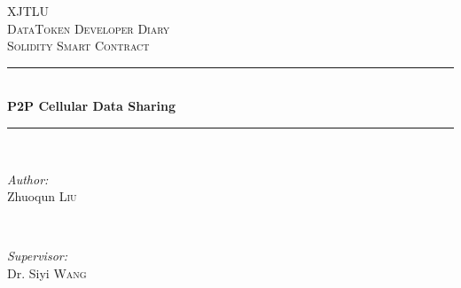\begin{titlepage}

\newcommand{\HRule}{\rule{\linewidth}{0.5mm}} %

\center %
 

\textsc{\LARGE XJTLU}\\[1.5cm] %
\textsc{\Large DataToken Developer Diary}\\[0.5cm] %
\textsc{\large Solidity Smart Contract}\\[0.5cm] %


\HRule \\[0.4cm]
{ \huge \bfseries P2P Cellular Data Sharing}\\[0.4cm] %
\HRule \\[1.5cm]
 

\begin{minipage}{0.4\textwidth}
\begin{flushleft} \large
\emph{Author:}\\
Zhuoqun \textsc{Liu} %
\end{flushleft}
\end{minipage}
~
\begin{minipage}{0.4\textwidth}
\begin{flushright} \large
\emph{Supervisor:} \\
Dr. Siyi \textsc{Wang} %
\end{flushright}
\end{minipage}\\[2cm]



\end{titlepage}
